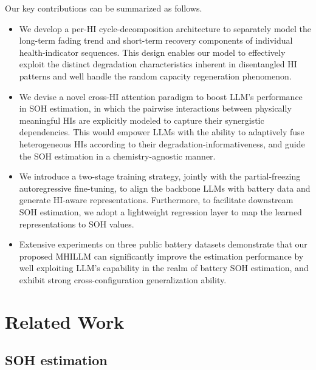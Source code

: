 \documentclass[preprint,12pt]{elsarticle}
\begin{document}
  Our key contributions can be summarized as follows.
\begin{itemize}
\item We develop a per-HI cycle-decomposition architecture to separately model the long-term fading trend and short-term recovery components of individual health-indicator sequences. This design enables our model to effectively exploit the distinct degradation characteristics inherent in disentangled HI patterns and well handle the random capacity regeneration phenomenon.

\item We devise a novel cross-HI attention paradigm to boost LLM's performance in SOH estimation, in which the pairwise interactions between physically meaningful HIs are explicitly modeled to capture their synergistic dependencies. This would empower LLMs with the ability to adaptively fuse heterogeneous HIs according to their degradation-informativeness, and guide the SOH estimation in a chemistry-agnostic manner.

\item We introduce a two-stage training strategy, jointly with the partial-freezing autoregressive fine-tuning, to align the backbone LLMs with battery data and generate HI-aware representations. Furthermore, to facilitate downstream SOH estimation, we adopt a lightweight regression layer to map the learned representations to SOH values.

\item Extensive experiments on three public battery datasets demonstrate that our proposed MHILLM can significantly improve the estimation performance by well exploiting LLM's capability in the realm of battery SOH estimation, and exhibit strong cross-configuration generalization ability.
\end{itemize}



\section{Related Work}

\subsection{SOH estimation}
\end{document}
